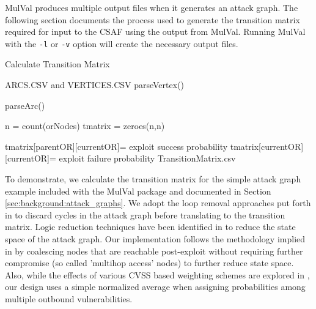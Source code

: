 
MulVal produces multiple output files when it generates an attack graph. The following section documents the process used to generate the transition matrix required for input to the CSAF using the output from MulVal. Running MulVal with the \verb|-l| or \verb|-v| option will create the necessary output files.


\begin{algorithm}[ht]
\caption{Calculate Transition Matrix}
\label{genTransMatrix}

\begin{algorithmic}
\REQUIRE ARCS.CSV and VERTICES.CSV
 \STATE parseVertex() 
\ENDFOR

 \STATE parseArc() 
\ENDFOR

\STATE n = count(orNodes) 
\STATE tmatrix = zeroes(n,n) 

 \STATE tmatrix[parentOR][currentOR]= exploit success probability
 \ENDFOR
 \STATE tmatrix[currentOR][currentOR]= exploit failure probability %
\ENDFOR
 \RETURN TransitionMatrix.csv
\end{algorithmic}
\end{algorithm}


To demonstrate, we calculate the transition matrix for the simple attack graph example included with the MulVal package and documented in Section \ref{sec:background:attack_graphs}. We adopt the loop removal approaches put forth in \cite{Ou_Boyer_McQueen_2006} to discard cycles in the attack graph before translating to the transition matrix. Logic reduction techniques have been identified in \cite{Hong_Kim_Takaoka_2013} to reduce the state space of the attack graph.  Our implementation follows the methodology implied in \cite{Abraham_2016} by coalescing nodes that are reachable post-exploit without requiring further compromise (so called 'multihop access' nodes) to further reduce state space. Also, while the effects of various CVSS based weighting schemes are explored in \cite{Sembiring_Ramadhan_Gondokaryono_Arman_2015}, our design uses a simple normalized average when assigning probabilities among multiple outbound vulnerabilities.

